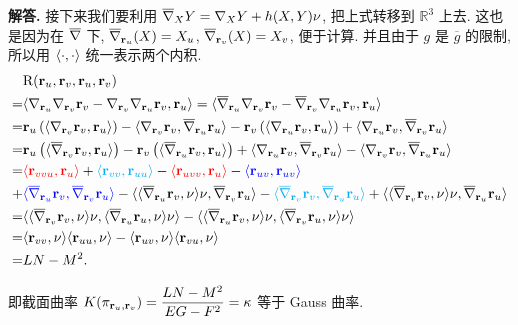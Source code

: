 \documentclass{ctexart}
\newenvironment{solution}{\par\noindent\textbf{解答. }}{\par}
\newcommand{\cred}{\textcolor{red}}
\newcommand{\cblue}{\textcolor{blue}}
\newcommand{\ccyan}{\textcolor{cyan}}
\begin{document}
\begin{solution}
    接下来我们要利用 $\overline{\nabla}_{X}Y = \nabla_{X}Y + h(X, Y)\nu$, 把上式转移到 $\mathbb{R}^3$ 上去. 这也是因为在 $\overline{\nabla}$ 下, $\overline{\nabla}_{\mathbf{r}_u}(X) = X_u$, $\overline{\nabla}_{\mathbf{r}_v}(X) = X_v$, 便于计算. 并且由于 $g$ 是 $\overline{g}$ 的限制, 所以用 $\langle {\cdot}, {\cdot} \rangle$ 统一表示两个内积.
    \[
        \begin{aligned}
             & \R(\rvec_u, \rvec_v, \rvec_u, \rvec_v) \\
            =& \Inner{\Div{\rvec_u}\Div{\rvec_v}\rvec_v - \Div{\rvec_v}\Div{\rvec_u}\rvec_v}{\rvec_u} = \Inner{\bDiv{\rvec_u}\Div{\rvec_v}\rvec_v - \bDiv{\rvec_v}\Div{\rvec_u}\rvec_v}{\rvec_u} \\
            =& \rvec_u\left( \Inner{\Div{\rvec_v}\rvec_v}{\rvec_u} \right) - \Inner{\Div{\rvec_v}\rvec_v}{\bDiv{\rvec_u}\rvec_u} - \rvec_v\left( \Inner{\Div{\rvec_u}\rvec_v}{\rvec_u} \right) + \Inner{\Div{\rvec_u}\rvec_v}{\bDiv{\rvec_v}\rvec_u} \\
            =& \rvec_u\left( \Inner{\bDiv{\rvec_v}\rvec_v}{\rvec_u} \right) - \rvec_v\left( \Inner{\bDiv{\rvec_u}\rvec_v}{\rvec_u} \right) + \Inner{\Div{\rvec_u}\rvec_v}{\bDiv{\rvec_v}\rvec_u} - \Inner{\Div{\rvec_v}\rvec_v}{\bDiv{\rvec_u}\rvec_u} \\
            =& \cred{\Inner{\rvec_{vvu}}{\rvec_u}} + \ccyan{\Inner{\rvec_{vv}}{\rvec_{uu}}} - \cred{\Inner{\rvec_{uvv}}{\rvec_u}} - \cblue{\Inner{\rvec_{uv}}{\rvec_{uv}}} \\
            +& \cblue{\Inner{\bDiv{\rvec_u}\rvec_v}{\bDiv{\rvec_v}\rvec_u}} - \Inner{\Inner{\bDiv{\rvec_u}\rvec_v}{\nu}\nu}{\bDiv{\rvec_v}\rvec_u} - \ccyan{\Inner{\bDiv{\rvec_v}\rvec_v}{\bDiv{\rvec_u}\rvec_u}} + \Inner{\Inner{\bDiv{\rvec_v}\rvec_v}{\nu}\nu}{\bDiv{\rvec_u}\rvec_u} \\
            =& \Inner{\Inner{\bDiv{\rvec_v}\rvec_v}{\nu}\nu}{\Inner{\bDiv{\rvec_u}\rvec_u}{\nu}\nu} - \Inner{\Inner{\bDiv{\rvec_u}\rvec_v}{\nu}\nu}{\Inner{\bDiv{\rvec_v}\rvec_u}{\nu}\nu} \\
            =& \Inner{\rvec_{vv}}{\nu}\Inner{\rvec_{uu}}{\nu} - \Inner{\rvec_{uv}}{\nu}\Inner{\rvec_{vu}}{\nu} \\
            =& LN - M^2.
        \end{aligned}
    \]

    即截面曲率 $K(\pi_{\mathbf{r}_u, \mathbf{r}_v}) = \dfrac{LN - M^2}{EG - F^2} = \kappa$ 等于 Gauss 曲率.
\end{solution}
\end{document}
